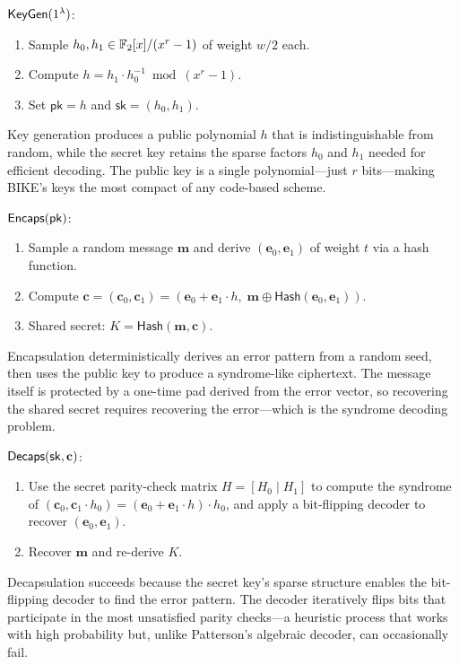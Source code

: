 \begin{definition}
\label{def:bike}

\medskip
\noindent$\mathsf{KeyGen}(1^\lambda)$:
\begin{enumerate}
\item Sample $h_0, h_1 \in \mathbb{F}_2[x]/(x^r - 1)$ of weight $w/2$ each.
\item Compute $h = h_1 \cdot h_0^{-1} \bmod (x^r - 1)$.
\item Set $\mathsf{pk} = h$ and $\mathsf{sk} = (h_0, h_1)$.
\end{enumerate}

Key generation produces a public polynomial $h$ that is indistinguishable from random, while the secret key retains the sparse factors $h_0$ and $h_1$ needed for efficient decoding.  The public key is a single polynomial---just $r$ bits---making BIKE's keys the most compact of any code-based scheme.

\medskip
\noindent$\mathsf{Encaps}(\mathsf{pk})$:
\begin{enumerate}
\item Sample a random message $\mathbf{m}$ and derive $(\mathbf{e}_0, \mathbf{e}_1)$ of weight $t$ via a hash function.
\item Compute $\mathbf{c} = (\mathbf{c}_0, \mathbf{c}_1) = (\mathbf{e}_0 + \mathbf{e}_1 \cdot h,\; \mathbf{m} \oplus \mathsf{Hash}(\mathbf{e}_0, \mathbf{e}_1))$.
\item Shared secret: $K = \mathsf{Hash}(\mathbf{m}, \mathbf{c})$.
\end{enumerate}

Encapsulation deterministically derives an error pattern from a random seed, then uses the public key to produce a syndrome-like ciphertext.  The message itself is protected by a one-time pad derived from the error vector, so recovering the shared secret requires recovering the error---which is the syndrome decoding problem.

\medskip
\noindent$\mathsf{Decaps}(\mathsf{sk}, \mathbf{c})$:
\begin{enumerate}
\item Use the secret parity-check matrix $H = [H_0 \mid H_1]$ to compute the syndrome of $(\mathbf{c}_0, \mathbf{c}_1 \cdot h_0) = (\mathbf{e}_0 + \mathbf{e}_1 \cdot h) \cdot h_0$, and apply a bit-flipping decoder to recover $(\mathbf{e}_0, \mathbf{e}_1)$.
\item Recover $\mathbf{m}$ and re-derive $K$.
\end{enumerate}

Decapsulation succeeds because the secret key's sparse structure enables the bit-flipping decoder to find the error pattern.  The decoder iteratively flips bits that participate in the most unsatisfied parity checks---a heuristic process that works with high probability but, unlike Patterson's algebraic decoder, can occasionally fail.
\end{definition}


